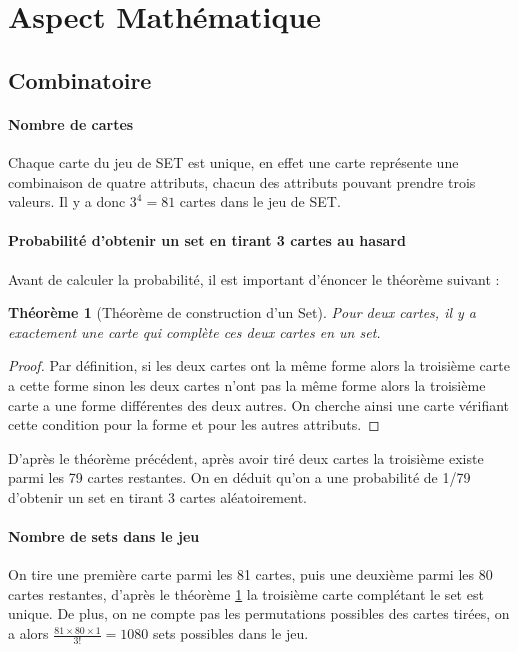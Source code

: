\documentclass[a4paper,12pt,titlepage]{article}
\theoremstyle{plain}
\newtheorem{thm}{Théorème}
\theoremstyle{definition}
\begin{document}
\section{Aspect Mathématique}
\subsection{Combinatoire}

\paragraph{Nombre de cartes} Chaque carte du jeu de SET est unique, en effet une carte représente une combinaison de quatre attributs, chacun des attributs pouvant prendre trois valeurs. Il y a donc $3^4=81$ cartes dans le jeu de SET.

\paragraph{Probabilité d'obtenir un set en tirant 3 cartes au hasard} Avant de calculer la probabilité, il est important d'énoncer le théorème suivant :

\begin{thm}[Théorème de construction d'un Set]\label{thm:Construction}
Pour deux cartes, il y a exactement une carte qui complète ces deux cartes en un set.
\end{thm}
\begin{proof}
Par définition, si les deux cartes ont la même forme alors la troisième carte a cette forme sinon les deux cartes n'ont pas la même forme alors la troisième carte a une forme différentes des deux autres. On cherche ainsi une carte vérifiant cette condition pour la forme et pour les autres attributs.
\end{proof}
D'après le théorème précédent, après avoir tiré deux cartes la troisième existe parmi les 79 cartes restantes. On en déduit qu'on a une probabilité de 1/79 d'obtenir un set en tirant 3 cartes aléatoirement.

\paragraph{Nombre de sets dans le jeu} On tire une première carte parmi les 81 cartes, puis une deuxième parmi les 80 cartes restantes, d'après le théorème \ref{thm:Construction} la troisième carte complétant le set est unique. De plus, on ne compte pas les permutations possibles des cartes tirées, on a alors $\frac{81 \times 80 \times 1}{3!} = 1080$ sets possibles dans le jeu.
\end{document}
